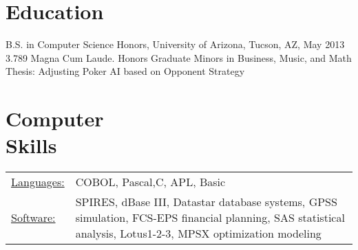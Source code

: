 \documentclass[line]{res}
\begin{document}
\begin{resume}
\section{Education} 
B.S. in Computer Science Honors, University of Arizona, Tucson, AZ, May 2013 \\
3.789 Magna Cum Laude. Honors Graduate
Minors in Business, Music, and Math
Thesis: Adjusting Poker AI based on Opponent Strategy

\section{Computer \\ Skills}
   \begin{tabular}{l p{3in}}
    \underline{Languages:} & COBOL, Pascal,C, APL, Basic \\

     \underline{Software:} &  SPIRES, dBase III, Datastar database 
                        systems, GPSS simulation, FCS-EPS financial 
                        planning, SAS statistical analysis, 
                        Lotus1-2-3, MPSX optimization modeling 
 \end{tabular}

\end{resume} 
\end{document}
